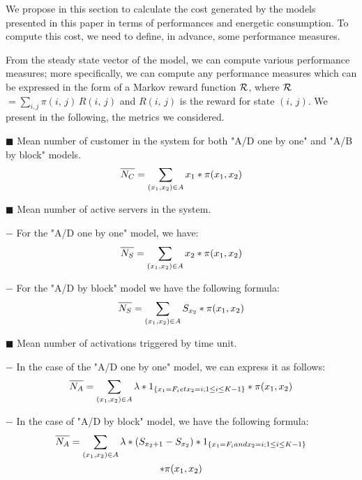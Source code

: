\documentclass[conference]{IEEEtran}
\begin{document}
 We propose in this section to calculate the cost generated by the models presented in this paper in terms of performances and energetic consumption. To compute this cost, we need to define, in advance, some performance measures.

From the steady state vector of the model, we can compute various performance measures; more specifically, we can compute any performance measures which can be expressed in the form of a Markov reward function $\cal{R}$, where $\cal{R}$ $=\sum_{i,j}\pi(i,\,j) \,R(i,\,j)$  and $R(i,\,j)$ is the reward for state $(i,\,j)$.
 We present in the following, the metrics we considered.


  $\blacksquare$ Mean number of customer  in the system for both "A/D one by one"  and "A/B by block" models.
\begin{equation}
\overline{\mathstrut N_{C}}=\sum_{(x_{1},x_{2}) \in A}x_{1}*\pi(x_{1},x_{2})
\end{equation}

$\blacksquare$ Mean number of active servers in the system.

 $-$ For the  "A/D one by one" model, we have:
\begin{equation}
\overline{\mathstrut N_{S}}=\sum_{(x_{1},x_{2}) \in A}x_{2}*\pi(x_{1},x_{2})
\end{equation}

$-$ For the  "A/D by block" model we have the following formula:
\begin{equation}
\overline{\mathstrut N_{S}}=\sum_{(x_{1},x_{2}) \in A}S_{x_{2}}*\pi(x_{1},x_{2})
\end{equation}

$\blacksquare$ Mean number of activations triggered by time unit.

 $-$ In the case of the "A/D one by one" model, we can express it as follows:
\begin{multline}
\overline{\mathstrut N_{A}}=\sum_{(x_{1},x_{2}) \in A}\lambda*1_{\{x_{1}=F_{i} \mbox{ et } x_{2}=i \mbox{ ; } 1 \leq i \leq K-1\}}*\pi(x_{1},x_{2})
\end{multline}

 $-$ In the case of  "A/D by block" model, we have the following formula:
\begin{multline}
\overline{\mathstrut N_{A}}=\sum_{(x_{1},x_{2}) \in A}\lambda*(S_{x_2+1}-S_{x_2})*1_{\{x_{1}=F_{i} \mbox{ and } x_{2}=i \mbox{ ; } 1 \leq i \leq K-1\}}\\
*\pi(x_{1},x_{2})
\end{multline}
\end{document}
